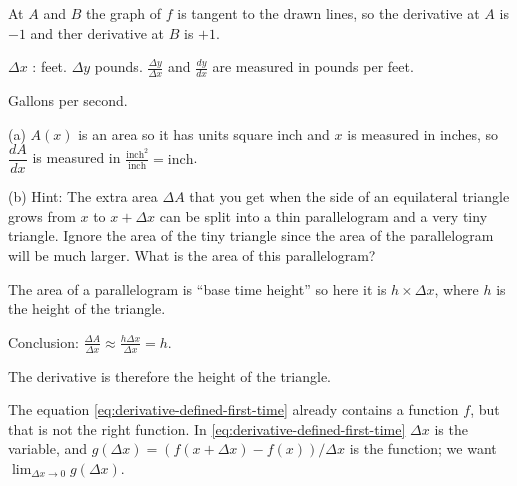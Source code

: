 \item[{\bfseries(II6.5)}]

At $A$ and $B$ the graph of $f$ is tangent to the drawn lines, so
the derivative at $A$ is $-1$ and ther derivative at $B$ is $+1$.
\bigskip

\item[{\bfseries(II6.6)}]

$\Delta x$ : feet.  $\Delta y$ pounds. $\frac{\Delta y}{\Delta x}$
and $\frac{dy}{dx}$ are measured in pounds per feet.
\bigskip

\item[{\bfseries(II6.7)}]

Gallons per second.
\bigskip

\item[{\bfseries(II6.8b)}]

(a) $A(x)$ is an area so it has units square inch and $x$ is
measured in inches, so $\dfrac{dA}{dx}$ is measured in
$\displaystyle\frac{\text{inch}^2}{\text{inch}} = \text{inch}$.



(b) Hint: The extra area $\Delta A$ that you get when the side of
an equilateral triangle grows from $x$ to $x+\Delta x$ can be
split into a thin parallelogram and a very tiny triangle.  Ignore
the area of the tiny triangle since the area of the parallelogram
will be much larger.  What is the area of this parallelogram?




The area of a parallelogram is ``base time height'' so here it is
$h\times\Delta x$, where $h$ is the height of the triangle.




Conclusion: $\displaystyle \frac{\Delta A}{\Delta x}
\approx\frac{h\Delta x}{\Delta x} = h$.




The derivative is therefore the height of the triangle.




\bigskip

\item[{\bfseries(III4.3)}]

The equation \eqref{eq:derivative-defined-first-time} already
contains a function $f$, but that is not the right function.  In
\eqref{eq:derivative-defined-first-time} $\Delta x$ is the variable,
and $g(\Delta x) = (f(x+\Delta x)-f(x))/\Delta x$ is the function; we
want $\lim_{\Delta x\to 0}g(\Delta x)$.
\bigskip

